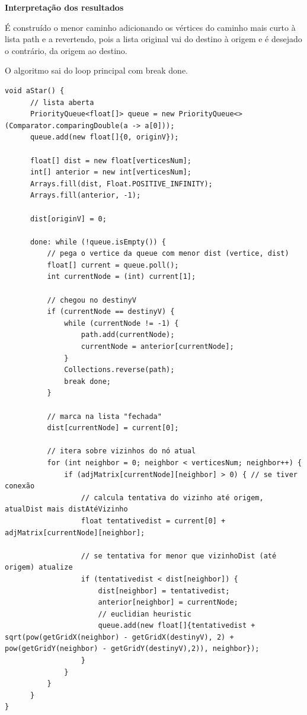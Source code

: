 \documentclass[
	12pt,				%
	oneside,			%
	a4paper,			%
	english,			%
	brazil,				%
	]{abntex2}
\begin{document}
{\textbf{Interpretação dos resultados}

É construído o menor caminho adicionando os vértices do caminho mais curto à lista path e a revertendo, pois a lista original vai do destino à origem e é desejado o contrário, da origem ao destino.

O algoritmo sai do loop principal com break done.


\begin{lstlisting}
void aStar() {
      // lista aberta
      PriorityQueue<float[]> queue = new PriorityQueue<>(Comparator.comparingDouble(a -> a[0]));
      queue.add(new float[]{0, originV});

      float[] dist = new float[verticesNum];
      int[] anterior = new int[verticesNum];
      Arrays.fill(dist, Float.POSITIVE_INFINITY);
      Arrays.fill(anterior, -1);
      
      dist[originV] = 0;
      
      done: while (!queue.isEmpty()) {
          // pega o vertice da queue com menor dist (vertice, dist)
          float[] current = queue.poll();
          int currentNode = (int) current[1];

          // chegou no destinyV
          if (currentNode == destinyV) {
              while (currentNode != -1) {
                  path.add(currentNode);
                  currentNode = anterior[currentNode];
              }
              Collections.reverse(path);
              break done;
          }

          // marca na lista "fechada"
          dist[currentNode] = current[0];

          // itera sobre vizinhos do nó atual
          for (int neighbor = 0; neighbor < verticesNum; neighbor++) {
              if (adjMatrix[currentNode][neighbor] > 0) { // se tiver conexão
                  // calcula tentativa do vizinho até origem, atualDist mais distAtéVizinho
                  float tentativedist = current[0] + adjMatrix[currentNode][neighbor];

                  // se tentativa for menor que vizinhoDist (até origem) atualize
                  if (tentativedist < dist[neighbor]) {
                      dist[neighbor] = tentativedist;
                      anterior[neighbor] = currentNode;
                      // euclidian heuristic
                      queue.add(new float[]{tentativedist + sqrt(pow(getGridX(neighbor) - getGridX(destinyV), 2) + pow(getGridY(neighbor) - getGridY(destinyV),2)), neighbor});
                  }
              }
          }
      }
}
\end{lstlisting}

}
\end{document}
